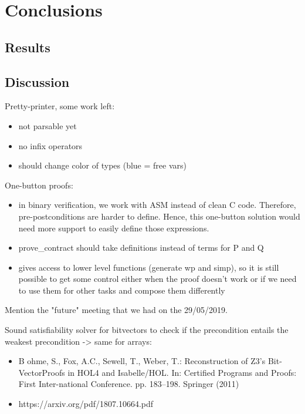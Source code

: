 \documentclass{kththesis}
\begin{document}
\chapter{Conclusions}
\section{Results}
\section{Discussion}

Pretty-printer, some work left:

\begin{itemize}
    \item not parsable yet
    \item no infix operators
    \item should change color of types (blue = free vars)
\end{itemize}

One-button proofs:

\begin{itemize}
    \item in binary verification, we work with ASM instead of clean C code. Therefore, pre-postconditions are harder to define. Hence, this one-button solution would need more support to easily define those expressions.
    \item prove\_contract should take definitions instead of terms for P and Q
    \item gives access to lower level functions (generate wp and simp), so it is still possible to get some control either when the proof doesn't work or if we need to use them for other tasks and compose them differently
\end{itemize}

Mention the "future" meeting that we had on the 29/05/2019.

Sound satisfiability solver for bitvectors to check if the precondition entails the weakest precondition -> same for arrays:

\begin{itemize}
    \item B ohme,  S.,  Fox,  A.C.,  Sewell,  T.,  Weber,  T.:  Reconstruction  of  Z3's  Bit-VectorProofs in HOL4 and Isabelle/HOL. In: Certified Programs and Proofs: First Inter-national Conference. pp. 183--198. Springer (2011)
    \item https://arxiv.org/pdf/1807.10664.pdf
\end{itemize}
\end{document}
